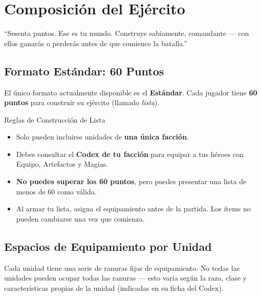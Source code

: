 
\chapter{Composición del Ejército}

\begin{loreblock}
``Sesenta puntos. Ese es tu mundo. Construye sabiamente, comandante — con ellos ganarás o perderás antes de que comience la batalla.''
\end{loreblock}

\vspace{0.4cm}

\section{Formato Estándar: 60 Puntos}

El único formato actualmente disponible es el \textbf{Estándar}. Cada jugador tiene \textbf{60 puntos} para construir su ejército (llamado \textit{lista}).

\begin{reglaespecial}{Reglas de Construcción de Lista}
\begin{itemize}
    \item Solo pueden incluirse unidades de \textbf{una única facción}.
    \item Debes consultar el \textbf{Codex de tu facción} para equipar a tus héroes con Equipo, Artefactos y Magias.
    \item \textbf{No puedes superar los 60 puntos}, pero puedes presentar una lista de menos de 60 como válida.
    \item Al armar tu lista, asigna el equipamiento antes de la partida. Los ítems no pueden cambiarse una vez que comienza.
\end{itemize}
\end{reglaespecial}

\section{Espacios de Equipamiento por Unidad}

Cada unidad tiene una serie de ranuras fijas de equipamiento. No todas las unidades pueden ocupar todas las ranuras — esto varía según la raza, clase y características propias de la unidad (indicadas en su ficha del Codex).

